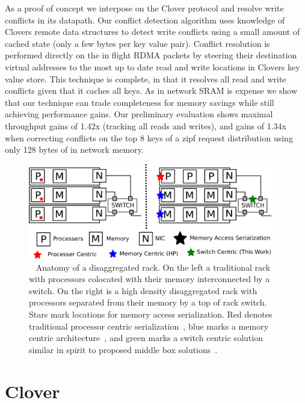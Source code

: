 As a proof of concept we interpose on the Clover protocol and resolve
write conflicts in its datapath. Our conflict detection algorithm uses
knowledge of Clovers remote data structures to detect write conflicts
using a small amount of cached state (only a few bytes per key value
pair). Conflict resolution is performed directly on the in flight RDMA
packets by steering their destination virtual addresses to the most up
to date read and write locations in Clovers key value store. This
technique is complete, in that it resolves all read and write
conflicts given that it caches all keys. As in network SRAM is expense
we show that our technique can trade completeness for memory savings
while still achieving performance gains. Our preliminary evaluation
shows maximal throughput gains of 1.42x (tracking all reads and
writes), and gains of 1.34x when correcting conflicts on the top 8
keys of a zipf request distribution using only 128 bytes of in network
memory.

\begin{figure}
      \centering
      \includegraphics[width=0.95\textwidth]{fig/overview.png}
      \caption{~
      Anatomy of a disaggregated rack. On the left a
      traditional rack with processors colocated with their memory
      interconnected by a switch. On the right is a high density
      disaggregated rack with processors separated from their memory
      by a top of rack switch. Stars mark locations for memory access
      serialization. Red denotes traditional processor centric
      serialization~\cite{memc3, cell, sonuma, storm, clover}, blue marks a
      memory centric architecture~\cite{aguilera2019designing}, and
      green marks a switch centric solution similar in spirit to
      proposed middle box solutions~\cite{254120}.
      \label{fig:overview}
      }
\end{figure}

\section{Clover}

